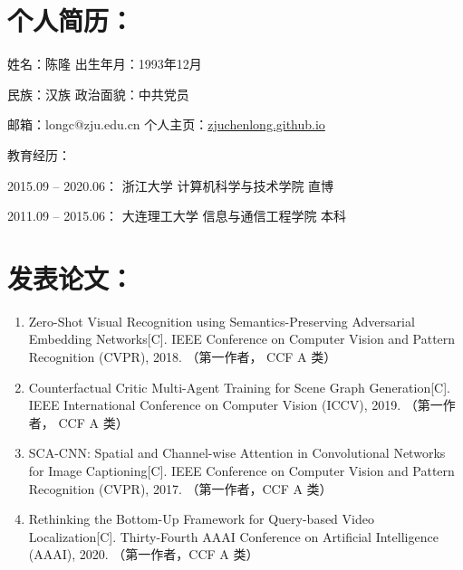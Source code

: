 \begin{publications}
\section*{个人简历：}
姓名：陈隆 \qquad\qquad\qquad\qquad\qquad\qquad 出生年月：1993年12月

民族：汉族 \qquad\qquad\qquad\qquad\qquad\qquad 政治面貌：中共党员

邮箱：longc@zju.edu.cn \qquad\qquad\qquad\hspace{0.3em}  个人主页：\href{http://zjuchenlong.github.io}{zjuchenlong.github.io} 
 
\vspace{1.0em}
教育经历：
\begin{asparaitem}                                                
\item{2015.09 – 2020.06： \quad 浙江大学 \qquad\qquad 计算机科学与技术学院 \qquad       直博}
\item{2011.09 – 2015.06： \quad 大连理工大学 \qquad 信息与通信工程学院 \qquad\quad 本科}  
\end{asparaitem}

\section*{发表论文：}
\begin{enumerate}
\item{
Zero-Shot Visual Recognition using Semantics-Preserving Adversarial Embedding Networks[C].
IEEE Conference on Computer Vision and Pattern Recognition (CVPR), 2018.
（第一作者， CCF A 类）
}

\item{
Counterfactual Critic Multi-Agent Training for Scene Graph Generation[C].
IEEE International Conference on Computer Vision (ICCV), 2019.
（第一作者， CCF A 类）
}

\item{
SCA-CNN: Spatial and Channel-wise Attention in Convolutional Networks for Image Captioning[C].
IEEE Conference on Computer Vision and Pattern Recognition (CVPR), 2017.
（第一作者，CCF A 类）
}

\item{
Rethinking the Bottom-Up Framework for Query-based Video Localization[C].
Thirty-Fourth AAAI Conference on Artificial Intelligence (AAAI), 2020.
（第一作者，CCF A 类）
}


\end{enumerate}
\end{publications}
